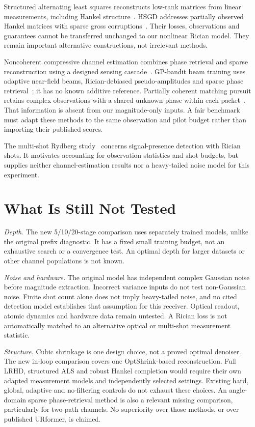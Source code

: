 \documentclass[journal]{IEEEtran}
\begin{document}
Structured alternating least squares reconstructs low-rank matrices from
linear measurements, including Hankel structure~\cite{zachariah2012}.
HSGD addresses partially observed Hankel matrices with sparse gross
corruptions~\cite{cai2023}. Their losses, observations and guarantees
cannot be transferred unchanged to our nonlinear Rician model. They
remain important alternative constructions, not irrelevant methods.

Noncoherent compressive channel estimation combines phase retrieval and
sparse reconstruction using a designed sensing cascade~\cite{rasekh2018}.
GP-bandit beam training uses adaptive near-field beams, Rician-debiased
pseudo-amplitudes and sparse phase retrieval~\cite{wang2026}; it has no
known additive reference. Partially coherent matching pursuit retains
complex observations with a shared unknown phase within each
packet~\cite{yi2024}. That information is absent from our magnitude-only
inputs. A fair benchmark must adapt these methods to the same observation
and pilot budget rather than importing their published scores.

The multi-shot Rydberg study~\cite{atapattu2026} concerns signal-presence
detection with Rician shots. It motivates accounting for observation
statistics and shot budgets, but supplies neither channel-estimation
results nor a heavy-tailed noise model for this experiment.

\section{What Is Still Not Tested}
\textit{Depth.} The new 5/10/20-stage comparison uses separately trained
models, unlike the original prefix diagnostic. It has a fixed small
training budget, not an exhaustive search or a convergence test. An
optimal depth for larger datasets or other channel populations is not known.

\textit{Noise and hardware.} The original model has independent complex
Gaussian noise before magnitude extraction. Incorrect variance inputs
do not test non-Gaussian noise. Finite shot count alone does not imply
heavy-tailed noise, and no cited detection model establishes that
assumption for this receiver. Optical readout, atomic dynamics and
hardware data remain untested. A Rician loss is not automatically matched
to an alternative optical or multi-shot measurement statistic.

\textit{Structure.} Cubic shrinkage is one design choice, not a proved
optimal denoiser. The new in-loop comparison covers one OptShrink-based
reconstruction. Full LRHD, structured ALS and robust Hankel completion
would require their own adapted measurement models and independently
selected settings. Existing hard,
global, adaptive and no-filtering controls do not exhaust these choices.
An angle-domain sparse phase-retrieval method is also a relevant missing
comparison, particularly for two-path channels. No superiority over those
methods, or over published URformer, is claimed.
\end{document}
